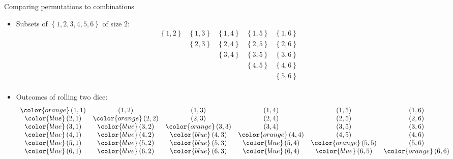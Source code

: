 \documentclass{beamer}
\theoremstyle{definition}
\begin{document}
\begin{frame}{Comparing permutations to combinations}
\begin{itemize}
\item Subsets of $\left\{1,2,3,4,5,6\right\}$ of size $2$:
\[\begin{array}{ccccc}
\left\{1,2\right\}&\left\{1,3\right\}&\left\{1,4\right\}&\left\{1,5\right\}
  &\left\{1,6\right\}\\
&\left\{2,3\right\}&\left\{2,4\right\}&\left\{2,5\right\}&\left\{2,6\right\}\\
&&\left\{3,4\right\}&\left\{3,5\right\}&\left\{3,6\right\}\\
&&&\left\{4,5\right\}&\left\{4,6\right\}\\
&&&&\left\{5,6\right\}\\
\end{array}\]
\item Outcomes of rolling two dice:
\[\begin{array}{cccccc}
{\color{orange}\left(1,1\right)}&\left(1,2\right)&\left(1,3\right)
&\left(1,4\right)&\left(1,5\right)&\left(1,6\right)\\
{\color{blue}\left(2,1\right)}&{\color{orange}\left(2,2\right)}&\left(2,3\right)
&\left(2,4\right)&\left(2,5\right)&\left(2,6\right)\\
{\color{blue}\left(3,1\right)}&{\color{blue}\left(3,2\right)}
&{\color{orange}\left(3,3\right)}
&\left(3,4\right)&\left(3,5\right)&\left(3,6\right)\\
{\color{blue}\left(4,1\right)}&{\color{blue}\left(4,2\right)}
&{\color{blue}\left(4,3\right)}
&{\color{orange}\left(4,4\right)}&\left(4,5\right)&\left(4,6\right)\\
{\color{blue}\left(5,1\right)}&{\color{blue}\left(5,2\right)}
&{\color{blue}\left(5,3\right)}
&{\color{blue}\left(5,4\right)}&{\color{orange}\left(5,5\right)}
&\left(5,6\right)\\
{\color{blue}\left(6,1\right)}&{\color{blue}\left(6,2\right)}
&{\color{blue}\left(6,3\right)}
&{\color{blue}\left(6,4\right)}&{\color{blue}\left(6,5\right)}
&{\color{orange}\left(6,6\right)}
\end{array}\]
\end{itemize}
\end{frame}
\end{document}
